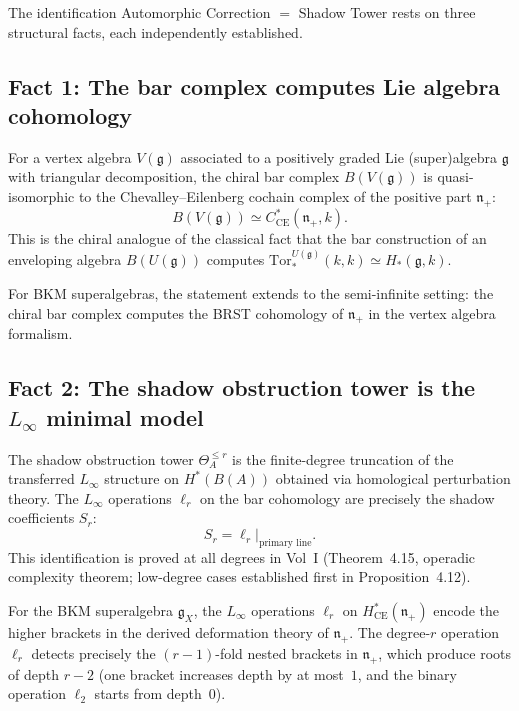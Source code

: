 \documentclass[11pt]{amsart}
\theoremstyle{definition}
\theoremstyle{remark}
\newcommand{\fg}{\mathfrak{g}}
\newcommand{\fn}{\mathfrak{n}}
\begin{document}
The identification Automorphic Correction $=$ Shadow Tower
rests on three structural facts, each independently established.

\subsection{Fact 1: The bar complex computes Lie algebra
cohomology}

For a vertex algebra $V(\fg)$ associated to a positively graded
Lie (super)algebra $\fg$ with triangular decomposition, the
chiral bar complex $B(V(\fg))$ is quasi-isomorphic to the
Chevalley--Eilenberg cochain complex of the positive part
$\fn_+$:
\begin{equation}\label{eq:bar-ce}
 B(V(\fg)) \simeq C^*_{\mathrm{CE}}(\fn_+, k).
\end{equation}
This is the chiral analogue of the classical fact that the bar
construction of an enveloping algebra $B(U(\fg))$ computes
$\mathrm{Tor}^{U(\fg)}_*(k, k) \simeq H_*(\fg, k)$.

For BKM superalgebras, the statement extends to the
semi-infinite setting: the chiral bar complex computes the
BRST cohomology of $\fn_+$ in the vertex algebra formalism.

\subsection{Fact 2: The shadow obstruction tower is the $L_\infty$ minimal
model}

The shadow obstruction tower $\Theta^{\leq r}_A$ is the
finite-degree truncation of the transferred $L_\infty$ structure
on $H^*(B(A))$ obtained via homological perturbation theory.
The $L_\infty$ operations $\ell_r$ on the bar cohomology are
precisely the shadow coefficients $S_r$:
\begin{equation}\label{eq:shadow-linf}
 S_r = \ell_r|_{\text{primary line}}.
\end{equation}
This identification is proved at all degrees in
Vol~I (Theorem~4.15, operadic complexity theorem; low-degree
cases established first in Proposition~4.12).

For the BKM superalgebra $\fg_X$, the $L_\infty$ operations
$\ell_r$ on $H^*_{\mathrm{CE}}(\fn_+)$ encode the higher
brackets in the derived deformation theory of $\fn_+$. The
degree-$r$ operation $\ell_r$ detects precisely the
$(r-1)$-fold nested brackets in $\fn_+$, which produce roots
of depth $r - 2$ (one bracket increases depth by at most~$1$,
and the binary operation $\ell_2$ starts from depth~$0$).
\end{document}

